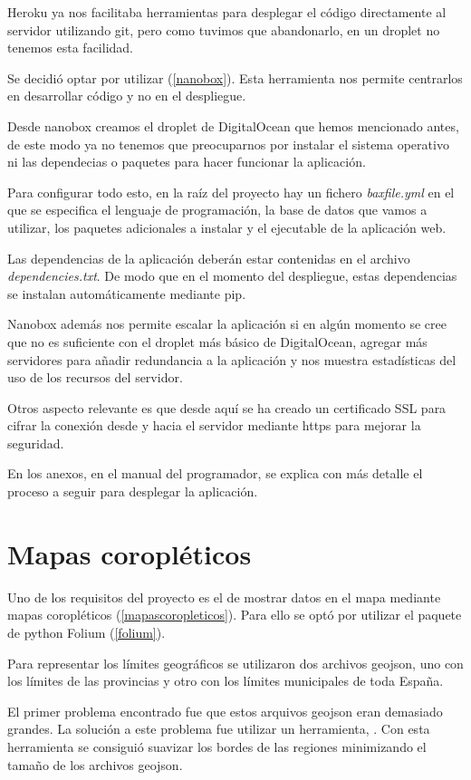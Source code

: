 Heroku ya nos facilitaba herramientas para desplegar el código directamente al servidor utilizando git, pero como tuvimos que abandonarlo, en un droplet no tenemos esta facilidad.

Se decidió optar por utilizar  (\ref{nanobox}). Esta herramienta nos permite centrarlos en desarrollar código y no en el despliegue.

Desde nanobox creamos el droplet de DigitalOcean que hemos mencionado antes, de este modo ya no tenemos que preocuparnos por instalar el sistema operativo ni las dependecias o paquetes para hacer funcionar la aplicación.

Para configurar todo esto, en la raíz del proyecto hay un fichero \textit{baxfile.yml} en el que se especifica el lenguaje de programación, la base de datos que vamos a utilizar, los paquetes adicionales a instalar y el ejecutable de la aplicación web.

Las dependencias de la aplicación deberán estar contenidas en el archivo \textit{dependencies.txt}. De modo que en el momento del despliegue, estas dependencias se instalan automáticamente mediante pip.

Nanobox además nos permite escalar la aplicación si en algún momento se cree que no es suficiente con el droplet más básico de DigitalOcean, agregar más servidores para añadir redundancia a la aplicación y nos muestra estadísticas del uso de los recursos del servidor.

Otros aspecto relevante es que desde aquí se ha creado un certificado SSL para cifrar la conexión  desde y hacia el servidor mediante https para mejorar la seguridad.

En los anexos, en el manual del programador, se explica con más detalle el proceso a seguir para desplegar la aplicación.

\section{Mapas coropléticos}

Uno de los requisitos del proyecto es el de mostrar datos en el mapa mediante mapas coropléticos (\ref{mapascoropleticos}). Para ello se optó por utilizar el paquete de python Folium (\ref{folium}).

Para representar los límites geográficos se utilizaron dos archivos geojson, uno con los límites de las provincias y otro con los límites municipales de toda España.

El primer problema encontrado fue que estos arquivos geojson eran demasiado grandes. La solución a este problema fue utilizar un herramienta, . Con esta herramienta se consiguió suavizar los bordes de las regiones minimizando el tamaño de los archivos geojson.

